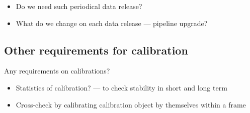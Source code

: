 \documentclass[a4paper,notitlepage]{article}
\begin{document}
\begin{itemize}
  \item Do we need such periodical data release?
  \item What do we change on each data release --- pipeline upgrade?
\end{itemize}


\subsection{Other requirements for calibration}

Any requirements on calibrations?

\begin{itemize}
  \item Statistics of calibration? --- to check stability in short and long 
    term
  \item Cross-check by calibrating calibration object by themselves within a 
    frame
\end{itemize}
\end{document}
